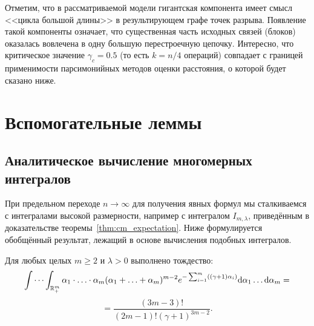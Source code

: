 Отметим, что в рассматриваемой модели гигантская компонента имеет смысл <<цикла большой длины>> в результирующем графе точек разрыва.
Появление такой компоненты означает, что существенная часть исходных связей (блоков) оказалась вовлечена в одну большую перестроечную цепочку.
Интересно, что критическое значение $\gamma_c = 0.5$ (то есть $k = n/4$ операций) совпадает с границей применимости парсимонийных методов оценки расстояния, о которой будет сказано ниже.

\section{Вспомогательные леммы}

\subsection{Аналитическое вычисление многомерных интегралов}

При предельном переходе $n \to \infty$ для получения явных формул мы сталкиваемся с интегралами высокой размерности, например с интегралом $I_{m,\lambda}$, приведённым в доказательстве теоремы~\ref{thm:cm_expectation}. Ниже формулируется обобщённый результат, лежащий в основе вычисления подобных интегралов.

\begin{lemma}\label{lem:integral}
Для любых целых $m \ge 2$ и $\lambda > 0$ выполнено тождество:
$$
    \idotsint_{ \mathbb{R}^m_+} {
        \alpha_1 \cdot \ldots \cdot \alpha_m
        (\alpha_1 + \ldots + \alpha_m) ^ {m - 2}
        e ^ { -\sum_{i=1}^{m} ((\gamma + 1) \alpha_i)}
        \mathrm{d} \alpha_1 \ldots \mathrm{d} \alpha_m
    } = $$ $$ =  \frac
    {(3 m - 3)!}
    {(2 m - 1)! (\gamma + 1) ^ {3 m - 2}}
    \label{l-int}.
$$
\end{lemma}

